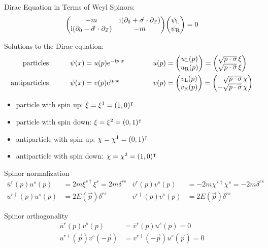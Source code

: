 			\noindent
			Dirac Equation in Terms of Weyl Spinors:
			\begin{equation}
				\label{Eq:DiracInTermsOfWeylSpinors}
				\mqty( -m & \i (\partial_0 + \vec{\sigma}\cdot\partial_{\vec{x}}) \\ \i (\partial_0 - \vec{\sigma}\cdot\partial_{\vec{x}}) & -m ) \mqty( \psi_\text{L} \\ \psi_\text{R} ) = 0
			\end{equation}

			\noindent
			Solutions to the Dirac equation:
			\begin{align}
				\text{particles}
				& \hsp
				\psi(x) = u(p) \ex^{-\i p \cdot x}
				& \hsp
				u(p) &= \mqty(
				u_\text{L}(p) \\
				u_\text{R}(p)
				) = \mqty(
				\sqrt{p\cdot\sigma}\,\xi \\
				\sqrt{p\cdot\barsigma}\,\xi
				) \\
				\text{antiparticles}
				& \hsp
				\bar{\psi}(x) = v(p) \ex^{\i p \cdot x}
				& \hsp
				v(p) &= \mqty(
				v_\text{L}(p) \\
				v_\text{R}(p)
				) = \mqty(
				\M\sqrt{p\cdot\sigma}\,\chi \\
				-\sqrt{p\cdot\barsigma}\,\chi
				)
			\end{align}
			\begin{itemize} \itemsep -0pt
				\item particle with spin up: $\xi=\xi^1 = (1, 0)^\intercal$
				\item particle with spin down: $\xi=\xi^2 = (0, 1)^\intercal$
				\item antiparticle with spin up: $\chi=\chi^1 = (0, 1)^\intercal$
				\item antiparticle with spin down: $\chi=\chi^2 = (1, 0)^\intercal$
			\end{itemize}

			\noindent
			Spinor normalization
			\begin{align}
				\bar{u}^r(p) u^s(p) &= 2m \xi^{s\dagger} \xi^s = 2m \delta^{rs}
				&
				\bar{v}^r(p) v^s(p) &= - 2m\chi^{s\dagger}\chi^s = - 2m\delta^{rs} \\
				u^{r\dagger}(p) u^s(p) &= 2E(\vec{p}) \delta^{rs}
				&
				v^{r\dagger}(p) v^s(p) &= 2E(\vec{p}) \delta^{rs}
			\end{align}

			\noindent
			Spinor orthogonality
			\begin{align}
				\bar{u}^r(p) v^s(p) &= \bar{v}^r(p) u^s(p) = 0 \\
				u^{r \dagger}(\vec{p}) v^s(-\vec{p}) &= v^{r \dagger}(-\vec{p}) u^s(\vec{p}) = 0
			\end{align}

